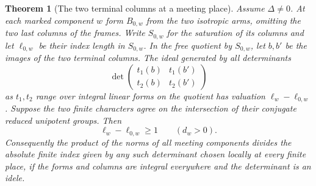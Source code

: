\documentclass[a4paper,11pt]{article}
\newtheorem{theorem}[proposition]{Theorem}
\theoremstyle{definition}
\theoremstyle{remark}
\numberwithin{equation}{section}
\begin{document}
\begin{theorem}[The two terminal columns at a meeting place]
\leavevmode\label{thm:terminalmeet681}
Assume \(\Delta\ne0\). At each marked component \(w\) form
\(B_{0,w}\) from the two isotropic arms, omitting the two last
columns of the frames. Write \(S_{0,w}\) for the saturation of
its columns and let \(\ell_{0,w}\) be their index length in
\(S_{0,w}\). In the free quotient by \(S_{0,w}\), let \(b,b'\)
be the images of the two terminal columns. The ideal generated
by all determinants
\[
 \det\begin{pmatrix}t_1(b)&t_1(b')\\t_2(b)&t_2(b')\end{pmatrix}
\]
as \(t_1,t_2\) range over integral linear forms on the quotient
has valuation \(\ell_w-\ell_{0,w}\).
Suppose the two finite characters agree on the intersection
of their conjugate reduced unipotent groups. Then
\[
             \ell_w-\ell_{0,w}\ge 1\qquad(d_w>0).
\]
Consequently the product of the norms of all meeting components
divides the absolute finite index given by any such determinant
chosen locally at every finite place, if the forms and columns
are integral everywhere and the determinant is an idele.
\end{theorem}
\end{document}
